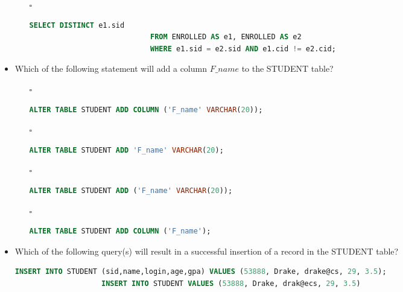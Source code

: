 \documentclass[10pt]{article}
\begin{document}
\begin{itemize}
\begin{enumerate}
					\item[$\square$] 
						\begin{lstlisting}[language=SQL,firstline=1, lastline=3, numbers = right] 
							SELECT DISTINCT e1.sid 
							FROM ENROLLED AS e1, ENROLLED AS e2 
							WHERE e1.sid = e2.sid AND e1.cid != e2.cid;
						\end{lstlisting}
				\end{enumerate}	

			\item Which of the following statement will add a column $F \_ name$ to the STUDENT table?
				\begin{enumerate}
					\item[$\square$] 
						\begin{lstlisting}[language=SQL,firstline=1, lastline=1, numbers = right] 
							ALTER TABLE STUDENT ADD COLUMN ('F_name' VARCHAR(20));
						\end{lstlisting} 
					
					\item[$\square$] 
						\begin{lstlisting}[language=SQL,firstline=1, lastline=1, numbers = right] 
							ALTER TABLE STUDENT ADD 'F_name' VARCHAR(20);
						\end{lstlisting} 
					
					\item[$\square$] 
						\begin{lstlisting}[language=SQL,firstline=1, lastline=1, numbers = right] 
							ALTER TABLE STUDENT ADD ('F_name' VARCHAR(20));
						\end{lstlisting} 
					
					\item[$\square$] 
						\begin{lstlisting}[language=SQL,firstline=1, lastline=1, numbers = right] 
							ALTER TABLE STUDENT ADD COLUMN ('F_name');
						\end{lstlisting}
				\end{enumerate}

			\newpage

			\item Which of the following query(s) will result in a successful insertion of a record in the STUDENT table?
				\begin{lstlisting}[language=SQL,firstline=1, lastline=2] 
					INSERT INTO STUDENT (sid,name,login,age,gpa) VALUES (53888, Drake, drake@cs, 29, 3.5);
					INSERT INTO STUDENT VALUES (53888, Drake, drak@ecs, 29, 3.5)
				\end{lstlisting} 


\end{itemize}
\end{document}
